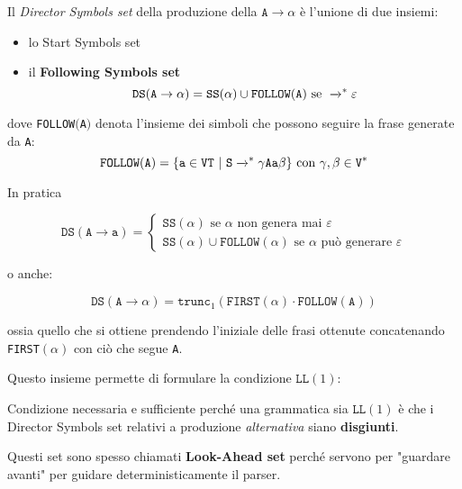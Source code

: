 \begin{mdframed}[topline=false,bottomline=false,rightline=false]
    Il \textit{Director Symbols set} della produzione della $\texttt{A} \rightarrow \alpha$ è l'unione di due insiemi:
    \begin{itemize}
        \item lo Start Symbols set
        \item il \textbf{Following Symbols set}
        \begin{equation*}
            \texttt{DS}(\texttt{A} \rightarrow \alpha) = \texttt{SS}(\alpha) \cup \texttt{FOLLOW}(\texttt{A}) \text{ se } \xrightarrow{}\mathrel{\vphantom{\to}^*} \varepsilon
        \end{equation*}
    \end{itemize}
    dove \texttt{FOLLOW}$($\texttt{A}$)$ denota l'insieme dei simboli che possono seguire la frase generate da \texttt{A}:
    \begin{equation*}
        \texttt{FOLLOW}(\texttt{A}) = \{\texttt{a} \in \texttt{VT}\ |\ \texttt{S} \xrightarrow{}\mathrel{\vphantom{\to}^*} \gamma\texttt{Aa}\beta\} \text{ con } \gamma, \beta \in \texttt{V}^*
    \end{equation*}
\end{mdframed}

In pratica

\begin{equation*}
    \texttt{DS}(\texttt{A} \rightarrow \texttt{a}) = 
    \begin{cases}
        \texttt{SS}(\alpha) \text{ se } \alpha \text{ non genera mai } \varepsilon\\
        \texttt{SS}(\alpha) \cup \texttt{FOLLOW}(\alpha) \text{ se } \alpha \text{ può generare } \varepsilon
    \end{cases}
\end{equation*}

o anche:

\begin{equation*}
    \texttt{DS}(\texttt{A} \rightarrow \alpha) = \texttt{trunc}_1(\texttt{FIRST}(\alpha) \cdot \texttt{FOLLOW}(\texttt{A}))
\end{equation*}

ossia quello che si ottiene prendendo l'iniziale delle frasi ottenute concatenando \texttt{FIRST}$(\alpha)$ con ciò che segue \texttt{A}.

Questo insieme permette di formulare la condizione $\texttt{LL}(1)$:
\begin{mdframed}[topline=false,bottomline=false,rightline=false]
    Condizione necessaria e sufficiente perché una grammatica sia $\texttt{LL}(1)$ è che i Director Symbols set relativi a produzione \textit{alternativa} siano \textbf{disgiunti}.
\end{mdframed}

Questi set sono spesso chiamati \textbf{Look-Ahead set} perché servono per "guardare avanti" per guidare deterministicamente il parser.






